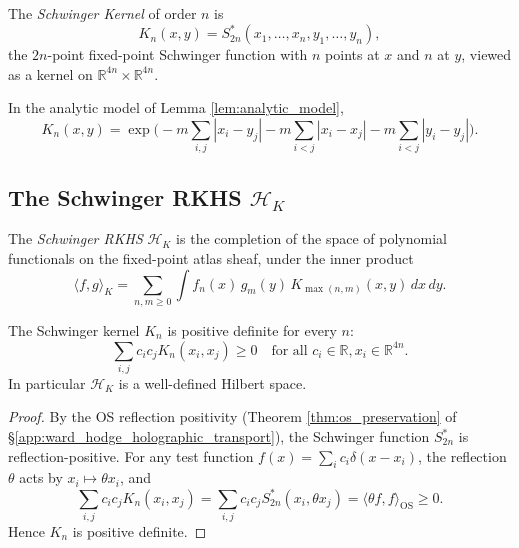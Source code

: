\begin{definition}
\label{def:schwinger_kernel}
The \emph{Schwinger Kernel} of order $n$ is
\[
K_{n}(x,y)=S_{2n}^{*}(x_{1},\dots,x_{n},y_{1},\dots,y_{n}),
\]
the $2n$-point fixed-point Schwinger function with $n$ points at $x$
and $n$ at $y$, viewed as a kernel on
$\mathbb{R}^{4n}\times\mathbb{R}^{4n}$.
\end{definition}

\begin{lemma}
\label{lem:kernel_analytic}
In the analytic model of Lemma \ref{lem:analytic_model},
\[
K_{n}(x,y)=\exp\!\Big(-m\sum_{i,j}|x_{i}-y_{j}|-m\sum_{i<j}|x_{i}-x_{j}|-m\sum_{i<j}|y_{i}-y_{j}|\Big).
\]
\end{lemma}

\subsection{The Schwinger RKHS $\mathcal{H}_{K}$}
\label{ssec:schwinger_rkhs}

\begin{definition}
\label{def:schwinger_rkhs}
The \emph{Schwinger RKHS} $\mathcal{H}_{K}$ is the completion of the
space of polynomial functionals on the fixed-point atlas sheaf, under
the inner product
\[
\langle f,g\rangle_{K}=\sum_{n,m\ge 0}\int f_{n}(x)\,g_{m}(y)\,
K_{\max(n,m)}(x,y)\,dx\,dy.
\]
\end{definition}

\begin{theorem}
\label{thm:kernel_pd}
The Schwinger kernel $K_{n}$ is positive definite for every $n$:
\[
\sum_{i,j}c_{i}c_{j}K_{n}(x_{i},x_{j})\ge 0
\quad\text{for all }c_{i}\in\mathbb{R},x_{i}\in\mathbb{R}^{4n}.
\]
In particular $\mathcal{H}_{K}$ is a well-defined Hilbert space.
\end{theorem}

\begin{proof}
By the OS reflection positivity (Theorem \ref{thm:os_preservation} of
\S\ref{app:ward_hodge_holographic_transport}), the Schwinger function
$S_{2n}^{*}$ is reflection-positive. For any test function
$f(x)=\sum_{i}c_{i}\delta(x-x_{i})$, the reflection $\theta$ acts by
$x_{i}\mapsto\theta x_{i}$, and
\[
\sum_{i,j}c_{i}c_{j}K_{n}(x_{i},x_{j})
=\sum_{i,j}c_{i}c_{j}S_{2n}^{*}(x_{i},\theta x_{j})
=\langle\theta f,f\rangle_{\mathrm{OS}}\ge 0.
\]
Hence $K_{n}$ is positive definite.
\end{proof}

